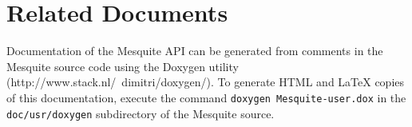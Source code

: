 \section{Related Documents}

Documentation of the Mesquite API can be generated from comments in the Mesquite
source code using the Doxygen utility (http://www.stack.nl/~dimitri/doxygen/).
To generate HTML and LaTeX copies of this documentation, execute the command 
{\tt doxygen Mesquite-user.dox} in the {\tt doc/usr/doxygen} subdirectory
of the Mesquite source.

